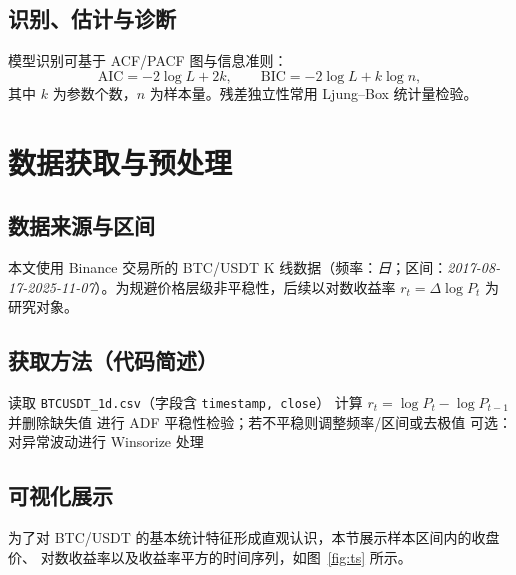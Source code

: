 \documentclass[12pt]{article}
\theoremstyle{definition}
\begin{document}
\subsection{识别、估计与诊断}
模型识别可基于 ACF/PACF 图与信息准则：
\[
    \mathrm{AIC} = -2\log L + 2k,\qquad
    \mathrm{BIC} = -2\log L + k\log n,
\]
其中 $k$ 为参数个数，$n$ 为样本量。残差独立性常用 Ljung--Box 统计量检验。

\section{数据获取与预处理}
\label{sec:data}
\subsection{数据来源与区间}
本文使用 Binance 交易所的 BTC/USDT K 线数据（频率：\emph{日}；区间：\emph{2017-08-17-2025-11-07}）。为规避价格层级非平稳性，后续以对数收益率 $r_t=\Delta\log P_t$ 为研究对象。

\subsection{获取方法（代码简述）}
\begin{algorithm}[H]
    \caption{数据读取与预处理（伪代码）}
    \begin{algorithmic}[1]
        \STATE 读取 \texttt{BTCUSDT\_1d.csv}（字段含 \texttt{timestamp, close}）
        \STATE 计算 $r_t = \log P_t - \log P_{t-1}$ 并删除缺失值
        \STATE 进行 ADF 平稳性检验；若不平稳则调整频率/区间或去极值
        \STATE 可选：对异常波动进行 Winsorize 处理
    \end{algorithmic}
\end{algorithm}

\subsection{可视化展示}

为了对 BTC/USDT 的基本统计特征形成直观认识，本节展示样本区间内的收盘价、
对数收益率以及收益率平方的时间序列，如图~\ref{fig:ts} 所示。
\end{document}
